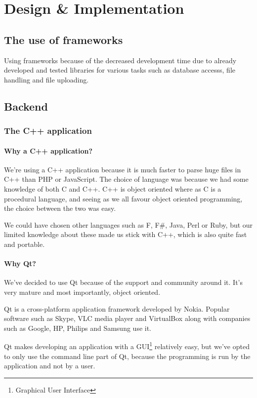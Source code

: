 \chapter{Design \& Implementation}
\section{The use of frameworks}
Using frameworks because of the decreased development time due to already developed and tested libraries for various tasks such as database accesss, file handling and file uploading.

\section{Backend}
\subsection{The C++ application}
\subsubsection{Why a C++ application?}
We're using a C++ application because it is much faster to parse huge files in C++ than PHP or JavaScript.
The choice of language was because we had some knowledge of both C and C++. C++ is object oriented where as C is a procedural language, and seeing as we all favour object oriented programming, the choice between the two was easy.

We could have chosen other languages such as F, F\#, Java, Perl or Ruby, but our limited knowledge about these made us stick with C++, which is also quite fast and portable.

\subsubsection{Why Qt?}
We've decided to use Qt because of the support and community around it. It's very mature and most importantly, object oriented.

Qt is a cross-platform application framework developed by Nokia. Popular software such as Skype, VLC media player and VirtualBox along with companies such as Google, HP, Philips and Samsung use it.

Qt makes developing an application with a GUI\footnote{Graphical User Interface} relatively easy, but we've opted to only use the command line part of Qt, because the programming is run by the application and not by a user.

